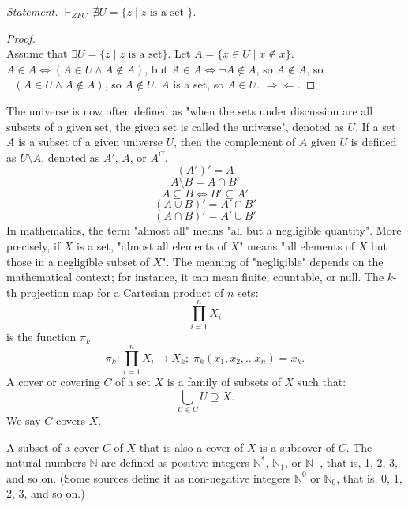 \documentclass[a4paper,12pt]{article}
\begin{document}
\textit{Statement.} $\vdash_{ZFC}\,\nexists U = \{z \mid z\text{\ is a set\ }\}$.
\begin{proof}\mbox{}\\
Assume that $\exists U = \{z \mid z\text{ is a set}\}$. Let $A=\{x\in U \mid x\notin x\}$. $A \in A\iff (A\in U \land A\notin A)$, but $A\in A \iff \neg A \notin A$, so $A\notin A$, so $\neg(A \in U \land A \notin A)$, so $A \notin U$. $A$ is a set, so $A\in U$. $\Rightarrow\Leftarrow$.
\end{proof}
The universe is now often defined as "when the sets under discussion are all subsets of a given set, the given set is called the universe", denoted as $U$.
If a set $A$ is a subset of a given universe $U$, then the complement of $A$ given $U$ is defined as $U\setminus A$, denoted as $A'$, $\overline{A}$, or $A^C$.
\[(A')'=A\]
\[A\setminus B = A\cap B'\]
\[A\subseteq B \iff B' \subseteq A'\]
\[(A\cup B)'=A'\cap B'\]
\[(A\cap B)'=A'\cup B'\]
In mathematics, the term "almost all" means "all but a negligible quantity". More precisely, if $X$ is a set, "almost all elements of $X$" means "all elements of $X$ but those in a negligible subset of $X$". The meaning of "negligible" depends on the mathematical context; for instance, it can mean finite, countable, or null.
The $k$-th projection map for a Cartesian product of $n$ sets:
\[\prod_{i=1}^nX_i\]
is the function $\pi_k$
\[\pi_k\colon\prod_{i=1}^nX_i\to X_k;\;\pi_k(x_1,x_2,\ldots x_n)=x_k.\]
A cover or covering $C$ of a set $X$ is a family of subsets of $X$ such that:
\[\bigcup_{U\in C}U\supseteq X.\]
We say $C$ covers $X$.

A subset of a cover $C$ of $X$ that is also a cover of $X$ is a subcover of $C$.
The natural numbers $\mathbb{N}$ are defined as positive integers $\mathbb{N}^*$, $\mathbb{N}_1$, or $\mathbb{N}^+$, that is, 1, 2, 3, and so on. (Some sources define it as non-negative integers $\mathbb{N}^0$ or $\mathbb{N}_0$, that is, 0, 1, 2, 3, and so on.)
\end{document}

